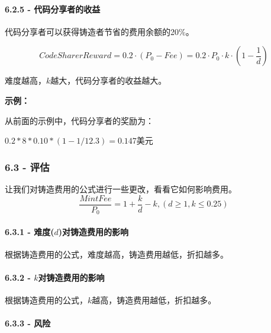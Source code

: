 \documentclass[
]{article}
\begin{document}
\paragraph{6.2.5 -
代码分享者的收益}\label{ux4ee3ux7801ux5206ux4eabux8005ux7684ux6536ux76ca}

代码分享者可以获得铸造者节省的费用余额的20\%。

\begin{equation}
CodeSharerReward = 0.2 \cdot (P_0 - Fee) = 0.2 \cdot P_0 \cdot k \cdot (1 - \frac{1}{d})
\end{equation}

难度越高，\(k\)越大，代码分享者的收益越大。

\textbf{示例：}

从前面的示例中，代码分享者的奖励为：

\(0.2 * 8 * 0.10 * (1 - 1/12.3) = 0.147\)美元

\subsubsection{6.3 - 评估}\label{ux8bc4ux4f30}

让我们对铸造费用的公式进行一些更改，看看它如何影响费用。
\begin{equation}
\frac{MintFee}{P_0} = 1 + \frac{k}{d} - k, (d \geq 1, k \leq 0.25)
\end{equation}

\paragraph{\texorpdfstring{6.3.1 -
难度(\(d\))对铸造费用的影响}{6.3.1 - 难度(d)对铸造费用的影响}}\label{ux96beux5ea6dux5bf9ux94f8ux9020ux8d39ux7528ux7684ux5f71ux54cd}

根据铸造费用的公式，难度越高，铸造费用越低，折扣越多。

\paragraph{\texorpdfstring{6.3.2 -
\(k\)对铸造费用的影响}{6.3.2 - k对铸造费用的影响}}\label{kux5bf9ux94f8ux9020ux8d39ux7528ux7684ux5f71ux54cd}

根据铸造费用的公式，\(k\)越高，铸造费用越低，折扣越多。

\paragraph{6.3.3 - 风险}\label{ux98ceux9669}
\end{document}
